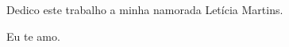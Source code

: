 %

\vspace*{3cm}


\vspace{19cm}

\hfill\begin{minipage}{12cm}
Dedico este trabalho a minha namorada Letícia Martins. 

Eu te amo. 
\end{minipage}

%

\newpage